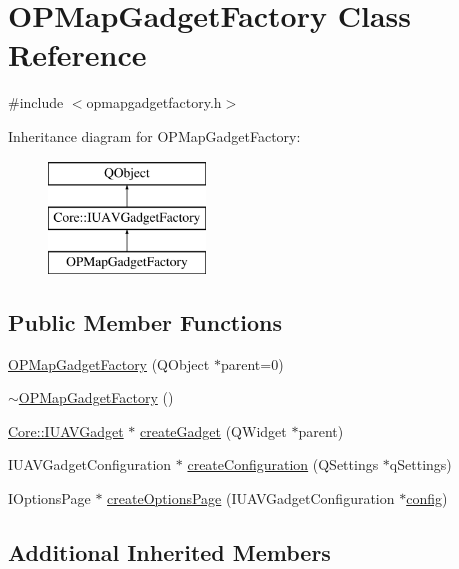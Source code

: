 \hypertarget{class_o_p_map_gadget_factory}{\section{O\-P\-Map\-Gadget\-Factory Class Reference}
\label{class_o_p_map_gadget_factory}
}


{\ttfamily \#include $<$opmapgadgetfactory.\-h$>$}

Inheritance diagram for O\-P\-Map\-Gadget\-Factory\-:\begin{figure}[H]
\begin{center}
\leavevmode
\includegraphics[height=3.000000cm]{class_o_p_map_gadget_factory}
\end{center}
\end{figure}
\subsection*{Public Member Functions}
\begin{DoxyCompactItemize}
\item 
\hyperlink{group___o_p_map_plugin_ga348bc36551d757fe6accc824bda0f622}{O\-P\-Map\-Gadget\-Factory} (Q\-Object $\ast$parent=0)
\item 
\hyperlink{group___o_p_map_plugin_ga20558255cdd8731aa6edd40d797d2c02}{$\sim$\-O\-P\-Map\-Gadget\-Factory} ()
\item 
\hyperlink{class_core_1_1_i_u_a_v_gadget}{Core\-::\-I\-U\-A\-V\-Gadget} $\ast$ \hyperlink{group___o_p_map_plugin_ga185fdb89aa5cd90c3112f9f39333703c}{create\-Gadget} (Q\-Widget $\ast$parent)
\item 
I\-U\-A\-V\-Gadget\-Configuration $\ast$ \hyperlink{group___o_p_map_plugin_ga7f75947f3d08a110f8289998a41f44ee}{create\-Configuration} (Q\-Settings $\ast$q\-Settings)
\item 
I\-Options\-Page $\ast$ \hyperlink{group___o_p_map_plugin_gadde2c412f864fe77db6ea353a5e7071b}{create\-Options\-Page} (I\-U\-A\-V\-Gadget\-Configuration $\ast$\hyperlink{deflate_8c_a4473b5227787415097004fd39f55185e}{config})
\end{DoxyCompactItemize}
\subsection*{Additional Inherited Members}


